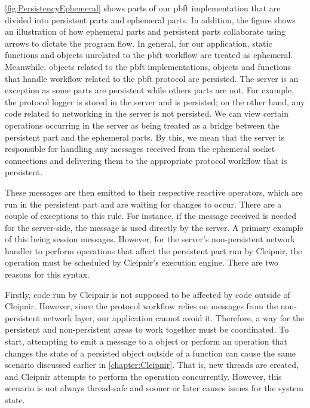 \autoref{fig:PersistencyEphemeral} shows parts of our \ac{pbft} implementation that are divided into persistent parts and ephemeral parts. In addition, the figure shows an illustration of how ephemeral parts and persistent parts collaborate using arrows to dictate the program flow. In general, for our application, static functions and objects unrelated to the \ac{pbft} workflow are treated as ephemeral. Meanwhile, objects related to the \ac{pbft} implementations,  objects and functions that handle workflow related to the \ac{pbft} protocol are persisted. The server is an exception as some parts are persistent while others parts are not. For example, the protocol logger is stored in the server and is persisted; on the other hand, any code related to networking in the server is not persisted.  We can view certain operations occurring in the server as being treated as a bridge between the persistent part and the ephemeral parts. By this, we mean that the server is responsible for handling any messages received from the ephemeral socket connections and delivering them to the appropriate protocol workflow that is persistent. 

These messages are then emitted to their respective reactive operators, which are run in the persistent part and are waiting for changes to occur. There are a couple of exceptions to this rule. For instance, if the message received is needed for the server-side, the message is used directly by the server. A primary example of this being session messages. However, for the server’s non-persistent network handler to perform operations that affect the persistent part run by Cleipnir, the operation must be scheduled by Cleipnir’s execution engine. There are two reasons for this syntax. 

Firstly, code run by Cleipnir is not supposed to be affected by code outside of Cleipnir. However, since the protocol workflow relies on messages from the non-persistent network layer, our application cannot avoid it. Therefore, a way for the persistent and non-persistent areas to work together must be coordinated. To start, attempting to emit a message to a  object or perform an operation that changes the state of a persisted object outside of a  function can cause the same scenario discussed earlier in \autoref{chapter:Cleipnir}. That is, new threads are created, and Cleipnir attempts to perform the operation concurrently. However, this scenario is not always thread-safe and sooner or later causes issues for the system state. 

